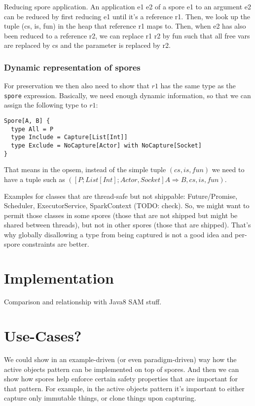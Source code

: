\documentclass{llncs}
\begin{document}
Reducing spore application. An application e1 e2 of a spore e1 to an argument
e2 can be reduced by first reducing e1 until it's a reference r1. Then, we
look up the tuple (cs, is, fun) in the heap that reference r1 maps to. Then,
when e2 has also been reduced to a reference r2, we can replace r1 r2 by fun
such that all free vars are replaced by cs and the parameter is replaced by
r2.

\subsubsection{Dynamic representation of spores}

For preservation we then also need to show that $r1$ has the same type as the
\verb|spore| expression. Basically, we need enough dynamic information, so
that we can assign the following type to $r1$:

\begin{lstlisting}
Spore[A, B] {
  type All = P
  type Include = Capture[List[Int]]
  type Exclude = NoCapture[Actor] with NoCapture[Socket]
}
\end{lstlisting}

That means in the opsem, instead of the simple tuple $(cs, is, fun)$ we need to
have a tuple such as
$([{P} ; {List[Int]} ; {Actor, Socket}] A \Rightarrow B, cs, is, fun)$.

Examples for classes that are thread-safe but not shippable: Future/Promise,
Scheduler, ExecutorService, SparkContext (TODO: check). So, we might want to
permit those classes in some spores (those that are not shipped but might be
shared between threads), but not in other spores (those that are shipped).
That's why globally disallowing a type from being captured is not a good idea
and per-spore constraints are better.


\section{Implementation}

Comparison and relationship with Java8 SAM stuff.

\section{Use-Cases?}

We could show in an example-driven (or even paradigm-driven) way how the
active objects pattern can be implemented on top of spores. And then we can
show how spores help enforce certain safety properties that are important for
that pattern. For example, in the active objects pattern it's important to
either capture only immutable things, or clone things upon capturing.
\end{document}
